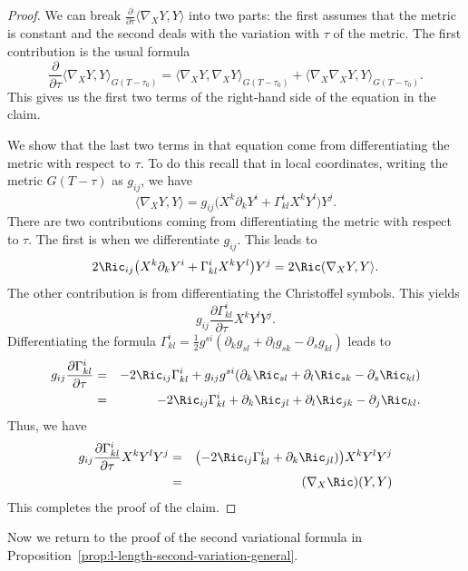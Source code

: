 \begin{proof}
\sketch
We can break $\frac{\partial}{\partial\tau}\langle \nabla_{X}Y,Y\rangle $ into
two parts: the first  assumes that the metric is constant and the second deals
with the variation with $\tau$ of the metric. The first contribution is the
usual formula
$$\frac{\partial}{\partial\tau}\langle \nabla_{X}Y,Y\rangle _{G(T-\tau_0)}=
\langle \nabla_{X}Y,\nabla_{X}Y\rangle _{G(T-\tau_0)}+ \langle
\nabla_{X}\nabla_{X}Y,Y\rangle _{G(T-\tau_0)}.$$ This gives us the first two
terms of the right-hand side of the equation in the claim.

We show that the last two terms in that equation come from differentiating the
metric with respect to $\tau$. To do this recall that in local coordinates,
writing the metric $G(T-\tau)$ as $g_{ij}$, we have
$$\langle \nabla_{X}Y,Y \rangle=g_{ij}\bigl(X^k\partial_k
Y^i+\Gamma_{kl}^iX^kY^l\bigr)Y^j.$$ There are two contributions coming from
differentiating the metric with respect to $\tau$. The first is when we
differentiate $g_{ij}$. This leads to
$$2\Ric_{ij}\bigl(X^k\partial_k
Y^i+\Gamma_{kl}^iX^kY^l\bigr)Y^j=2\Ric(\nabla_XY,Y\rangle.$$
The other contribution is from differentiating the Christoffel
symbols. This yields
$$g_{ij}\frac{\partial\Gamma^{i}_{kl}}{\partial \tau}X^{k}Y^{l}Y^{j}.$$
Differentiating the formula
$\Gamma_{kl}^i=\frac{1}{2}g^{si}(\partial_kg_{sl}+\partial_lg_{sk}-\partial_s
g_{kl})$ leads to \begin{eqnarray*} g_{ij}\frac{\partial
\Gamma_{kl}^i}{\partial \tau} & = & -2\Ric_{ij}\Gamma_{kl}^i+g_{ij}g^{si}(\partial_k\Ric_{sl}+\partial_l\Ric_{sk}
-\partial_s\Ric_{kl})\\
& = & -2\Ric_{ij}\Gamma_{kl}^i+
\partial_k\Ric_{jl}+\partial_l\Ric_{jk} -\partial_j\Ric_{kl}.
\end{eqnarray*}
Thus, we have
\begin{eqnarray*}
g_{ij}\frac{\partial\Gamma^{i}_{kl}}{\partial \tau}X^{k}Y^{l}Y^{j}
 & = & \bigl(-2\Ric_{ij}\Gamma^i_{kl}+\partial_k\Ric_{jl})\bigr)X^kY^lY^j \\
& = & (\nabla_X\Ric)(Y,Y)
\end{eqnarray*}
This completes the proof of the claim.
\end{proof}








Now we return to the proof of the second variational formula in
Proposition~\ref{prop:l-length-second-variation-general}.



